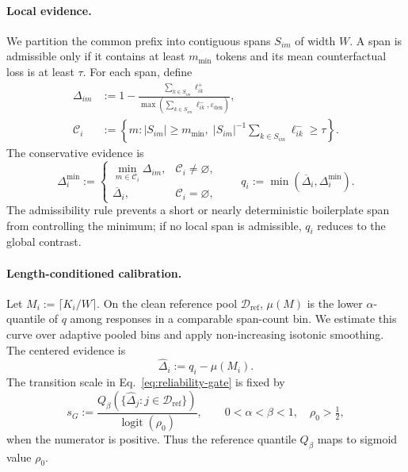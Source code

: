 \paragraph{Local evidence.}
We partition the common prefix into contiguous spans \(S_{im}\) of width
\(W\). A span is admissible only if it contains at least \(m_{\min}\)
tokens and its mean counterfactual loss is at least \(\tau\).
For each span, define
\begin{equation}
\begin{aligned}
  \Delta_{im}
  &:=1-
  \frac{\sum_{k\in S_{im}}\ell_{ik}^{+}}
       {\max\!\left(\sum_{k\in S_{im}}\ell_{ik}^{-},
                     \varepsilon_{\mathrm{den}}\right)},\\
  \mathcal C_i
  &:=\left\{m:
  |S_{im}|\ge m_{\min},\;
  |S_{im}|^{-1}\!\sum_{k\in S_{im}}\ell_{ik}^{-}\ge\tau
  \right\}.
\end{aligned}
  \label{eq:app-gate-local-gain}
\end{equation}
The conservative evidence is
\begin{equation}
  \Delta_i^{\min}
  :=
  \begin{cases}
    \min_{m\in\mathcal C_i}\Delta_{im}, & \mathcal C_i\ne\varnothing,\\
    \overline{\Delta}_i, & \mathcal C_i=\varnothing,
  \end{cases}
  \qquad
  q_i:=\min\!\left(\overline{\Delta}_i,\Delta_i^{\min}\right).
  \label{eq:app-gate-span-gain}
\end{equation}
The admissibility rule prevents a short or nearly deterministic
boilerplate span from controlling the minimum; if no local span is
admissible, \(q_i\) reduces to the global contrast.

\paragraph{Length-conditioned calibration.}
Let \(M_i:=\lceil K_i/W\rceil\). On the clean reference pool
\(\mathcal D_{\mathrm{ref}}\), \(\mu(M)\) is the lower
\(\alpha\)-quantile of \(q\) among responses in a comparable span-count
bin. We estimate this curve over adaptive pooled bins and apply
non-increasing isotonic smoothing. The centered evidence is
\begin{equation}
  \widehat{\Delta}_i:=q_i-\mu(M_i).
  \label{eq:app-gate-null-correction}
\end{equation}
The transition scale in Eq.~\eqref{eq:reliability-gate} is fixed by
\begin{equation}
  s_G
  :=
  \frac{Q_{\beta}\!\left(
  \{\widehat{\Delta}_j:j\in\mathcal D_{\mathrm{ref}}\}\right)}
       {\operatorname{logit}(\rho_0)},
  \qquad 0<\alpha<\beta<1,\quad \rho_0>\tfrac12,
  \label{eq:app-gate-scale}
\end{equation}
when the numerator is positive. Thus the reference quantile
\(Q_{\beta}\) maps to sigmoid value \(\rho_0\).

